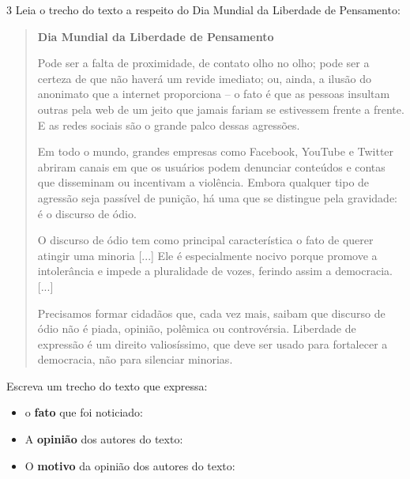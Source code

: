 \num{3} Leia o trecho do texto a respeito do Dia Mundial da Liberdade de
Pensamento:

\begin{quote}
\textbf{Dia Mundial da Liberdade de Pensamento}

Pode ser a falta de proximidade, de contato olho no olho; pode ser a
certeza de que não haverá um revide imediato; ou, ainda, a ilusão do
anonimato que a internet proporciona -- o fato é que as pessoas insultam
outras pela web de um jeito que jamais fariam se estivessem frente a
frente. E as redes sociais são o grande palco dessas agressões.

Em todo o mundo, grandes empresas como Facebook, YouTube e Twitter
abriram canais em que os usuários podem denunciar conteúdos e contas que
disseminam ou incentivam a violência. Embora qualquer tipo de agressão
seja passível de punição, há uma que se distingue pela gravidade: é o
discurso de ódio.

O discurso de ódio tem como principal característica o fato de querer
atingir uma minoria {[}...{]} Ele é especialmente nocivo porque promove
a intolerância e impede a pluralidade de vozes, ferindo assim
a democracia. {[}...{]}

Precisamos formar cidadãos que, cada vez mais, saibam que discurso de
ódio não é piada, opinião, polêmica ou controvérsia. Liberdade de
expressão é um direito valiosíssimo, que deve ser usado para fortalecer
a democracia, não para silenciar minorias.

\end{quote}

\begin{escolha}
\item Escreva um trecho do texto que expressa:


\begin{itemize}
\item o \textbf{fato} que foi noticiado: 

\item A \textbf{opinião} dos autores do texto: 
  
\item O \textbf{motivo} da opinião dos autores do texto: 
\end{itemize}

\end{escolha}

